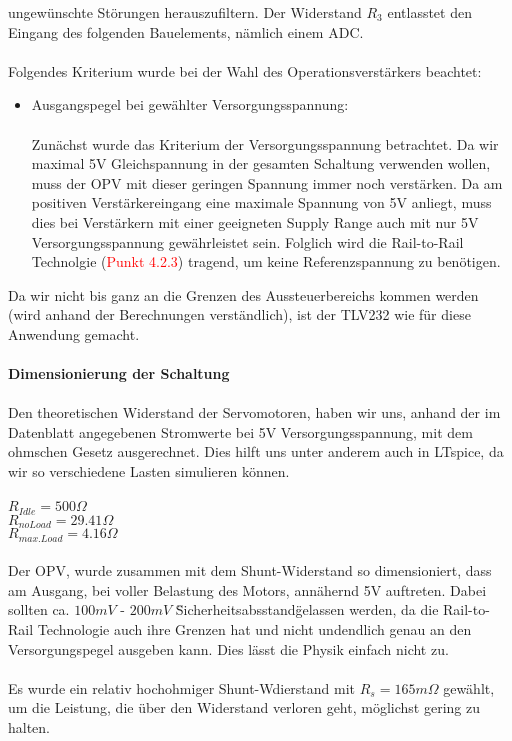 \documentclass[titlepage,12pt,twoside]{article}
\begin{document}
ungewünschte Störungen herauszufiltern. Der Widerstand $R_{3}$ entlasstet den Eingang des folgenden Bauelements, nämlich einem ADC. \\
\\
Folgendes Kriterium wurde bei der Wahl des Operationsverstärkers beachtet:
\begin{itemize}
	\item Ausgangspegel bei gewählter Versorgungsspannung: \\
		  \\
		  Zunächst wurde das Kriterium der Versorgungsspannung betrachtet. Da wir maximal
		  5V Gleichspannung in der gesamten Schaltung verwenden wollen, muss der OPV mit
		  dieser geringen Spannung immer noch verstärken. Da am positiven Verstärkereingang
		  eine maximale Spannung von 5V anliegt, muss dies bei Verstärkern mit einer geeigneten
		  Supply Range auch mit nur 5V Versorgungsspannung gewährleistet sein. Folglich wird
		  die Rail-to-Rail Technolgie (\textcolor{red}{Punkt 4.2.3}) tragend, um keine Referenzspannung
		  zu benötigen.
\end{itemize}
Da wir nicht bis ganz an die Grenzen des Aussteuerbereichs kommen werden (wird anhand der Berechnungen verständlich), ist der TLV232 wie für diese Anwendung gemacht. \\
\\
\textbf{Dimensionierung der Schaltung} \\
\\
Den theoretischen Widerstand der Servomotoren, haben wir uns, anhand der im Datenblatt angegebenen Stromwerte bei 5V Versorgungsspannung, mit dem ohmschen Gesetz ausgerechnet.
Dies hilft uns unter anderem auch in LTspice, da wir so verschiedene Lasten simulieren können. \\
\\
$R_{Idle} = 500\Omega$ \\
$R_{no Load} = 29.41\Omega$ \\
$R_{max. Load} = 4.16\Omega$ \\
\\
Der OPV, wurde zusammen mit dem Shunt-Widerstand so dimensioniert, dass am Ausgang, bei voller Belastung des Motors, annähernd 5V auftreten. Dabei sollten ca. $100mV$ - $200mV$ 
\"Sicherheitsabsstand\" gelassen werden, da die Rail-to-Rail Technologie auch ihre Grenzen hat und nicht undendlich genau an den Versorgungspegel ausgeben kann. Dies lässt die 
Physik einfach nicht zu. \\
\\
Es wurde ein relativ hochohmiger Shunt-Wdierstand mit $R_{s} = 165m\Omega$ gewählt, um die Leistung, die über den Widerstand verloren geht, möglichst gering zu halten. \\
\end{document}
